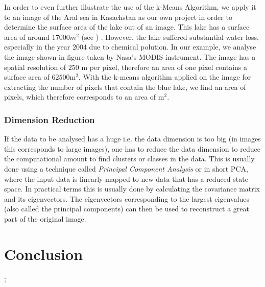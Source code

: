 In order to even further illustrate the use of the k-Means Algorithm, we apply it to an image of the Aral sea in Kasachstan as our own project in order to determine the surface area of the lake out of an image. This lake has a surface area of around  $17000m^{2}$ (see \protect\footnotemark)  . However, the lake suffered substantial water loss, especially in the year 2004 due to chemical polution. In our example, we analyse the image shown in figure  taken by Nasa's MODIS instrument. The image has a spatial resolution of $250$ m per pixel, therefore an area of one pixel contains a surface area of $62500\text{m}^{2}$. With the k-means algorithm applied on the image for extracting the number of pixels that contain the blue lake, we find an area of   pixels, which therefore corresponds to an area of   $\text{m}^{2}$. 
 



\subsubsection{Dimension Reduction}
If the data to be analysed has a huge i.e. the data dimension is too big (in images this corresponds to large images), one has to reduce the data dimension to reduce the computational amount to find clusters or classes in the data. This is usually done using a technique called \textit{Principal Component Analysis} or in short PCA, where the input data is linearly mapped to new data that has a reduced state space. In practical terms this is usually done by calculating the covariance matrix and its eigenvectors. The eigenvectors corresponding to the largest eigenvalues (also called the principal components) can then be used to reconstruct a great part of the original image.

\section{Conclusion}

;
